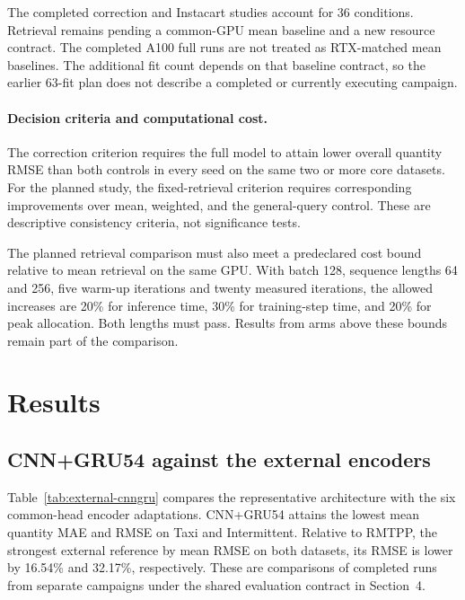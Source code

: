 \documentclass[runningheads]{llncs}
\begin{document}
The completed correction and Instacart studies account for 36 conditions. Retrieval remains pending a common-GPU mean baseline and a new resource contract. The completed A100 full runs are not treated as RTX-matched mean baselines. The additional fit count depends on that baseline contract, so the earlier 63-fit plan does not describe a completed or currently executing campaign.

\paragraph{Decision criteria and computational cost.}
The correction criterion requires the full model to attain lower overall quantity RMSE than both controls in every seed on the same two or more core datasets. For the planned study, the fixed-retrieval criterion requires corresponding improvements over mean, weighted, and the general-query control. These are descriptive consistency criteria, not significance tests.

The planned retrieval comparison must also meet a predeclared cost bound relative to mean retrieval on the same GPU. With batch 128, sequence lengths 64 and 256, five warm-up iterations and twenty measured iterations, the allowed increases are 20\% for inference time, 30\% for training-step time, and 20\% for peak allocation. Both lengths must pass. Results from arms above these bounds remain part of the comparison.

\section{Results}
\subsection{CNN+GRU54 against the external encoders}
Table~\ref{tab:external-cnngru} compares the representative architecture with the six common-head encoder adaptations. CNN+GRU54 attains the lowest mean quantity MAE and RMSE on Taxi and Intermittent. Relative to RMTPP, the strongest external reference by mean RMSE on both datasets, its RMSE is lower by 16.54\% and 32.17\%, respectively. These are comparisons of completed runs from separate campaigns under the shared evaluation contract in Section~4.
\end{document}
